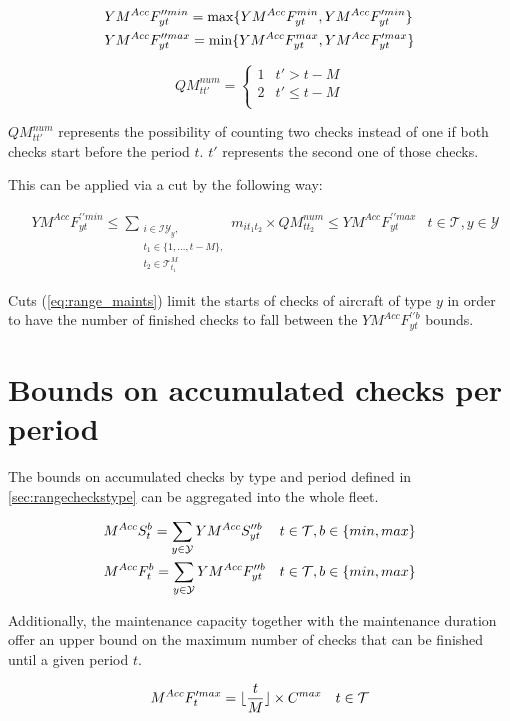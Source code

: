 \documentclass[a4paper,onecolumn,fleqn]{article}
\begin{document}
  \begin{align}
    & YM^{Acc}F^{\prime\prime min}_{yt} = \max\{YM^{Acc}F^{min}_{yt}, YM^{Acc}F^{\prime min}_{yt}\}\notag\\ 
    & YM^{Acc}F^{\prime\prime max}_{yt} = \min\{YM^{Acc}F^{max}_{yt}, YM^{Acc}F^{\prime max}_{yt}\}\notag
  \end{align}

  \[
    QM^{num}_{tt'} = 
    \begin{cases} 
     1 & t' > t - M \\
     2 & t' \le t - M \\
    \end{cases} 
  \]

  $QM^{num}_{tt'}$ represents the possibility of counting two checks instead of one if both checks start before the period $t$. $t'$ represents the second one of those checks. 

  This can be applied via a cut by the following way:

  \begin{align}
    & YM^{Acc}F^{\prime\prime min}_{yt} \le \sum_{\substack{i \in \mathcal{IY}_y, \\ t_1 \in \{1, \ldots, t - M\}, \\ t_2 \in \mathcal{T}^M_{t_1}}} m_{it_1t_2} \times QM^{num}_{tt_2} \le YM^{Acc}F^{\prime\prime max}_{yt}
        & t \in \mathcal{T}, y \in \mathcal{Y} \label{eq:range_maints}
  \end{align}

  Cuts (\ref{eq:range_maints}) limit the starts of checks of aircraft of type $y$ in order to have the number of finished checks to fall between the $YM^{Acc}F^{\prime\prime b}_{yt}$ bounds.

\section{Bounds on accumulated checks per period}
  
  The bounds on accumulated checks by type and period defined in \ref{sec:rangecheckstype} can be aggregated into the whole fleet.

  \begin{align}
    & M^{Acc}S^{b}_{t} = \sum_{y \in \mathcal{Y}} YM^{Acc}S^{\prime\prime b}_{yt}
        & t \in \mathcal{T}, b \in \{min, max\}  \notag\\
    & M^{Acc}F^{b}_{t} = \sum_{y \in \mathcal{Y}} YM^{Acc}F^{\prime\prime b}_{yt}
        & t \in \mathcal{T}, b \in \{min, max\}  \notag
  \end{align}

  Additionally, the maintenance capacity together with the maintenance duration offer an upper bound on the maximum number of checks that can be finished until a given period $t$.

  \begin{align}
    & M^{Acc}F^{\prime max}_{t} = \lfloor \frac{t}{M} \rfloor \times C^{max}
        & t \in \mathcal{T} \notag
  \end{align}
\end{document}
